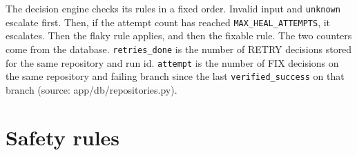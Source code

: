 The decision engine checks its rules in a fixed order. Invalid input and \texttt{unknown} escalate first. Then, if the attempt count has reached \texttt{MAX\_\allowbreak{}HEAL\_\allowbreak{}ATTEMPTS}, it escalates. Then the flaky rule applies, and then the fixable rule. The two counters come from the database. \texttt{retries\_\allowbreak{}done} is the number of RETRY decisions stored for the same repository and run id. \texttt{attempt} is the number of FIX decisions on the same repository and failing branch since the last \texttt{verified\_\allowbreak{}success} on that branch (source: app/\allowbreak{}db/\allowbreak{}repositories.py).

\section{Safety rules}

